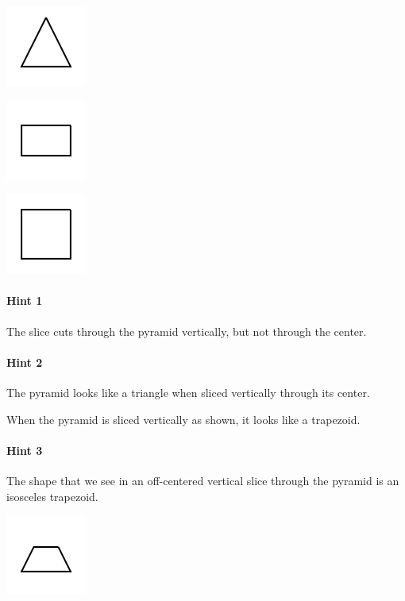 \documentclass[twocolumn,10pt]{article}
\def\shrinkfactor{0.4}
\begin{document}
 
\includegraphics[scale=\shrinkfactor]{figures/d443e0deb4dc18ef30fbf9139d310266f460b66b.png}


\includegraphics[scale=\shrinkfactor]{figures/0e5042b475e0847d67b74c0482f8e8173f798656.png}


\includegraphics[scale=\shrinkfactor]{figures/4b59a0ece6acc7c19c389e1de534d1df93bf1169.png}



\paragraph{Hint 1}The slice cuts through the pyramid vertically, but not through the center.

\paragraph{Hint 2}The pyramid looks like a triangle when sliced vertically through its center.

When the pyramid is sliced vertically as shown, it looks like a trapezoid.

\paragraph{Hint 3}The shape that we see in an off-centered vertical slice through the pyramid is an isosceles trapezoid.  

\includegraphics[scale=\shrinkfactor]{figures/462dbf19e63d9954ed7a531f7ea0e2b0379d9bb9.png}
\end{document}
